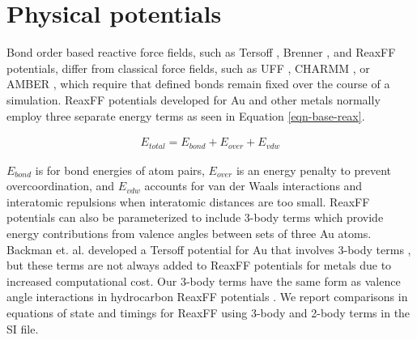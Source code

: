 \documentclass[12pt]{cmuthesis}
\begin{document}
\section{Physical potentials}
\label{sec:orgb02caba}
Bond order based reactive force fields, such as Tersoff \cite{tersoff-1988-new}, Brenner \cite{brenner-1990-empir}, and ReaxFF \cite{nielson-2005-devel-reaxf,duin-2001-reaxf} potentials, differ from classical force fields, such as UFF \cite{casewit-1992-applic,rappe-1992-uff}, CHARMM \cite{brooks-1983-charm}, or AMBER \cite{cornell-1995-secon-gener,cornell-1996-secon-gener}, which require that defined bonds remain fixed over the course of a simulation. ReaxFF potentials developed for Au and other metals normally employ three separate energy terms as seen in Equation \ref{eqn-base-reax}. \cite{jarvi-2008-devel-reaxf,keith-2010-react-forcef,cabrera-trujillo-2015-theor}

\begin{eqnarray}
E_{total} = E_{bond} + E_{over} + E_{vdw} \label{eqn-base-reax}
\end{eqnarray}

\(E_{bond}\) is for bond energies of atom pairs, \(E_{over}\) is an energy penalty to prevent overcoordination, and \(E_{vdw}\) accounts for van der Waals interactions and interatomic repulsions when interatomic distances are too small. ReaxFF potentials can also be parameterized to include 3-body terms which provide energy contributions from valence angles between sets of three Au atoms. Backman et. al. developed a Tersoff potential for Au that involves 3-body terms \cite{backman-2012-bond}, but these terms are not always added to ReaxFF potentials for metals due to increased computational cost. Our 3-body terms have the same form as valence angle interactions in hydrocarbon ReaxFF potentials \cite{nielson-2005-devel-reaxf}. We report comparisons in equations of state and timings for ReaxFF using 3-body and 2-body terms in the SI file.
\end{document}
